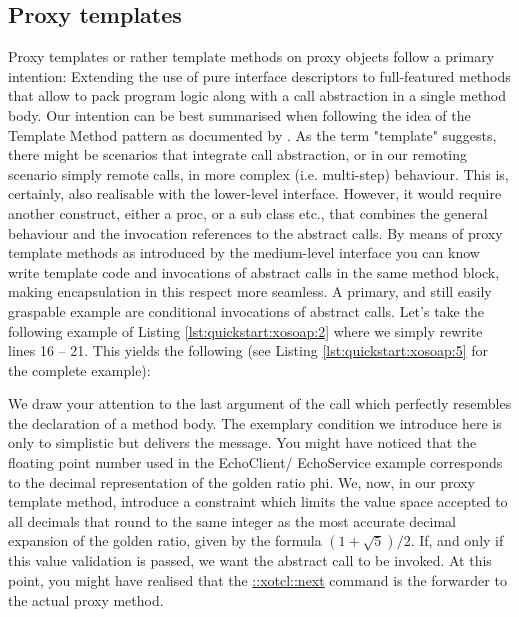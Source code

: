 \subsection{Proxy templates}\label{sec:advanced:template}
Proxy templates or rather template methods on proxy objects follow a primary intention: Extending the 
use of pure interface descriptors to full-featured methods that allow to pack program logic along with a 
call abstraction in a single method body. Our intention can be best summarised when following the idea 
of the Template Method pattern as documented by \cite{gof:1994}. As the term "template" suggests, there 
might be scenarios that integrate call abstraction, or in our remoting scenario simply remote calls, in 
more complex (i.e. multi-step) behaviour. This is, certainly, also realisable with the lower-level interface. 
However, it would require another construct, either a proc, or a sub class etc., that combines the general 
behaviour and the invocation references to the abstract calls. By means of proxy template methods as 
introduced by the medium-level interface you can know write template code and invocations of 
abstract calls in the same method block, making encapsulation in this respect more seamless. A 
primary, and still easily graspable example are conditional invocations of abstract calls. Let's take the 
following example of Listing \ref{lst:quickstart:xosoap:2} where we simply rewrite lines 16 -- 21. This 
yields the following (see Listing \ref{lst:quickstart:xosoap:5} for the complete example): 
\lstset{breaklines=true,numbers=left,basicstyle=\footnotesize,frame=single}

We draw your attention to the last argument of the  call which perfectly resembles the declaration of a method body. The exemplary condition we introduce here is only to simplistic but 
delivers the message. You might have noticed that the floating point number used in the EchoClient/
EchoService example corresponds to the decimal representation of the golden ratio phi. We, now, in our 
proxy template method, introduce a constraint which limits the value space accepted to all decimals that 
round to the same integer as the most accurate decimal expansion of the golden ratio, given by the 
formula \begin{math} (1 + \sqrt{5}) / 2\end{math}. If, and only if this value validation is passed, we want 
the abstract call to be invoked. At this point, you might have realised that the \href{http://media.wu-wien.ac.at/doc/tutorial.html#class_method_chaining}{::xotcl::next} command is the 
forwarder to the actual proxy method. 


